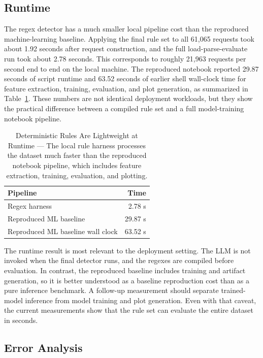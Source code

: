 \documentclass[letterpaper,twocolumn,10pt]{article}
\begin{document}
\subsection{Runtime}

The regex detector has a much smaller local pipeline cost than the reproduced machine-learning baseline. Applying the final rule set to all 61{,}065 requests took about 1.92 seconds after request construction, and the full load-parse-evaluate run took about 2.78 seconds. This corresponds to roughly 21{,}963 requests per second end to end on the local machine. The reproduced notebook reported 29.87 seconds of script runtime and 63.52 seconds of earlier shell wall-clock time for feature extraction, training, evaluation, and plot generation, as summarized in Table~\ref{tab:runtime}. These numbers are not identical deployment workloads, but they show the practical difference between a compiled rule set and a full model-training notebook pipeline.

\begin{table}[t]
\centering
\begin{tabular}{lr}
\toprule
Pipeline & Time \\
\midrule
Regex harness & 2.78 s \\
Reproduced ML baseline & 29.87 s \\
Reproduced ML baseline wall clock & 63.52 s \\
\bottomrule
\end{tabular}
\caption{Deterministic Rules Are Lightweight at Runtime --- The local rule harness processes the dataset much faster than the reproduced notebook pipeline, which includes feature extraction, training, evaluation, and plotting.}
\label{tab:runtime}
\end{table}

The runtime result is most relevant to the deployment setting. The LLM is not invoked when the final detector runs, and the regexes are compiled before evaluation. In contrast, the reproduced baseline includes training and artifact generation, so it is better understood as a baseline reproduction cost than as a pure inference benchmark. A follow-up measurement should separate trained-model inference from model training and plot generation. Even with that caveat, the current measurements show that the rule set can evaluate the entire dataset in seconds.

\subsection{Error Analysis}
\end{document}
